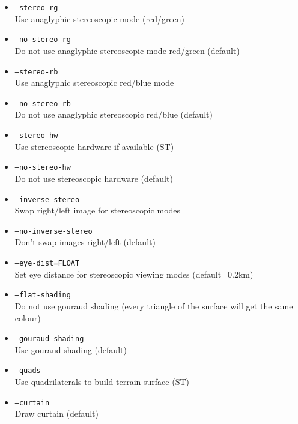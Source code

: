 \begin{itemize}
\item \texttt{--stereo-rg} \\
Use anaglyphic stereoscopic mode (red/green)

\item \texttt{--no-stereo-rg} \\
Do not use anaglyphic stereoscopic mode red/green (default)

\item \texttt{--stereo-rb} \\
Use anaglyphic stereoscopic red/blue mode

\item \texttt{--no-stereo-rb} \\
Do not use anaglyphic stereoscopic red/blue (default)

\item \texttt{--stereo-hw} \\
Use stereoscopic hardware if available (ST)

\item \texttt{--no-stereo-hw} \\
Do not use stereoscopic hardware (default)

\item \texttt{--inverse-stereo} \\
Swap right/left image for stereoscopic modes

\item \texttt{--no-inverse-stereo} \\
Don't swap images right/left (default)

\item \texttt{--eye-dist=FLOAT} \\
Set eye distance for stereoscopic viewing modes (default=0.2km)

\item \texttt{--flat-shading} \\
Do not use gouraud shading (every triangle of the surface will get the same colour)

\item \texttt{--gouraud-shading} \\
Use gouraud-shading (default)

\item \texttt{--quads}\\
Use quadrilaterals to build terrain surface (ST)

\item \texttt{--curtain} \\
Draw curtain (default)


\end{itemize}
